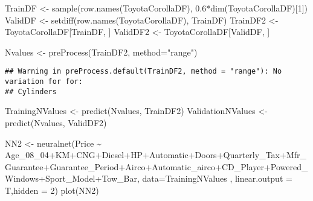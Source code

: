 \documentclass[
]{article}
\newenvironment{Shaded}{\begin{snugshade}}{\end{snugshade}}
\newcommand{\AttributeTok}[1]{\textcolor[rgb]{0.77,0.63,0.00}{#1}}
\newcommand{\DecValTok}[1]{\textcolor[rgb]{0.00,0.00,0.81}{#1}}
\newcommand{\FloatTok}[1]{\textcolor[rgb]{0.00,0.00,0.81}{#1}}
\newcommand{\FunctionTok}[1]{\textcolor[rgb]{0.00,0.00,0.00}{#1}}
\newcommand{\NormalTok}[1]{#1}
\newcommand{\OtherTok}[1]{\textcolor[rgb]{0.56,0.35,0.01}{#1}}
\newcommand{\SpecialCharTok}[1]{\textcolor[rgb]{0.00,0.00,0.00}{#1}}
\newcommand{\StringTok}[1]{\textcolor[rgb]{0.31,0.60,0.02}{#1}}
\begin{document}
\begin{Shaded}
\begin{Highlighting}[]
\NormalTok{TrainDF }\OtherTok{\textless{}{-}} \FunctionTok{sample}\NormalTok{(}\FunctionTok{row.names}\NormalTok{(ToyotaCorollaDF), }\FloatTok{0.6}\SpecialCharTok{*}\FunctionTok{dim}\NormalTok{(ToyotaCorollaDF)[}\DecValTok{1}\NormalTok{])  }
\NormalTok{ValidDF }\OtherTok{\textless{}{-}} \FunctionTok{setdiff}\NormalTok{(}\FunctionTok{row.names}\NormalTok{(ToyotaCorollaDF), TrainDF)  }
\NormalTok{TrainDF2 }\OtherTok{\textless{}{-}}\NormalTok{ ToyotaCorollaDF[TrainDF, ]}
\NormalTok{ValidDF2 }\OtherTok{\textless{}{-}}\NormalTok{ ToyotaCorollaDF[ValidDF, ]}
\end{Highlighting}
\end{Shaded}

\begin{Shaded}
\begin{Highlighting}[]
\NormalTok{Nvalues }\OtherTok{\textless{}{-}} \FunctionTok{preProcess}\NormalTok{(TrainDF2, }\AttributeTok{method=}\StringTok{"range"}\NormalTok{)}
\end{Highlighting}
\end{Shaded}

\begin{verbatim}
## Warning in preProcess.default(TrainDF2, method = "range"): No variation for for:
## Cylinders
\end{verbatim}

\begin{Shaded}
\begin{Highlighting}[]
\NormalTok{TrainingNValues }\OtherTok{\textless{}{-}} \FunctionTok{predict}\NormalTok{(Nvalues, TrainDF2)}
\NormalTok{ValidationNValues }\OtherTok{\textless{}{-}} \FunctionTok{predict}\NormalTok{(Nvalues, ValidDF2)}
\end{Highlighting}
\end{Shaded}

\begin{Shaded}
\begin{Highlighting}[]
\NormalTok{NN2 }\OtherTok{\textless{}{-}} \FunctionTok{neuralnet}\NormalTok{(Price }\SpecialCharTok{\textasciitilde{}}\NormalTok{ Age\_08\_04}\SpecialCharTok{+}\NormalTok{KM}\SpecialCharTok{+}\NormalTok{CNG}\SpecialCharTok{+}\NormalTok{Diesel}\SpecialCharTok{+}\NormalTok{HP}\SpecialCharTok{+}\NormalTok{Automatic}\SpecialCharTok{+}\NormalTok{Doors}\SpecialCharTok{+}\NormalTok{Quarterly\_Tax}\SpecialCharTok{+}\NormalTok{Mfr\_Guarantee}\SpecialCharTok{+}\NormalTok{Guarantee\_Period}\SpecialCharTok{+}\NormalTok{Airco}\SpecialCharTok{+}\NormalTok{Automatic\_airco}\SpecialCharTok{+}\NormalTok{CD\_Player}\SpecialCharTok{+}\NormalTok{Powered\_Windows}\SpecialCharTok{+}\NormalTok{Sport\_Model}\SpecialCharTok{+}\NormalTok{Tow\_Bar, }\AttributeTok{data=}\NormalTok{TrainingNValues , }\AttributeTok{linear.output =}\NormalTok{ T,}\AttributeTok{hidden =} \DecValTok{2}\NormalTok{)}
\FunctionTok{plot}\NormalTok{(NN2)}
\end{Highlighting}
\end{Shaded}
\end{document}
